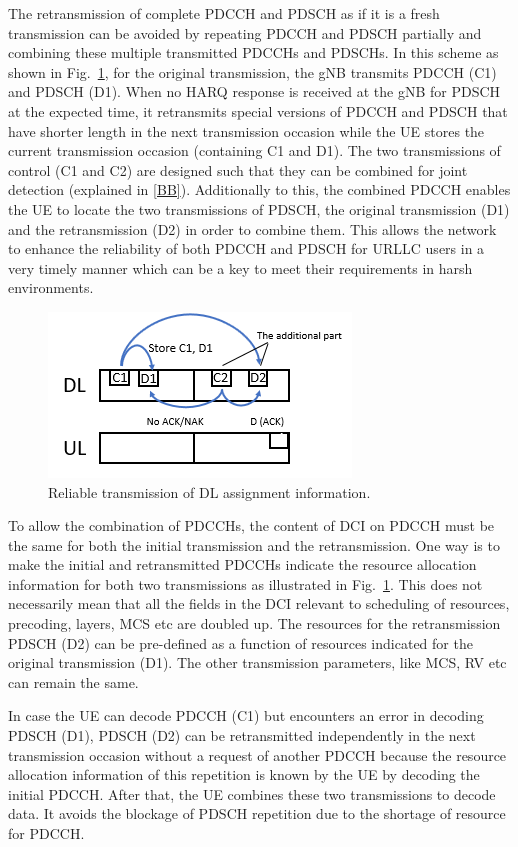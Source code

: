 \documentclass[conference,10pt]{IEEEtran}
\begin{document}
The retransmission of complete PDCCH and PDSCH as if it is a fresh transmission can be avoided by repeating PDCCH and PDSCH partially and combining these multiple transmitted PDCCHs and PDSCHs. In this scheme as shown in Fig.~\ref{fig1}, for the original transmission, the gNB transmits PDCCH (C1) and PDSCH (D1). When no HARQ response is received at the gNB for PDSCH at the expected time, it retransmits special versions of PDCCH and PDSCH that have shorter length in the next transmission occasion while the UE stores the current transmission occasion (containing C1 and D1). The two transmissions of control (C1 and C2) are designed such that they can be combined for joint detection (explained in \ref{BB}). Additionally to this, the combined PDCCH enables the UE to locate the two transmissions of PDSCH, the original transmission (D1) and the retransmission (D2) in order to combine them. This allows the network to enhance the reliability of both PDCCH and PDSCH for URLLC users in a very timely manner which can be a key to meet their requirements in harsh environments. 

\begin{figure}[htb]
\centerline{\includegraphics[scale=0.6]{fig1.png}}
\caption{Reliable transmission of DL assignment information.}
\label{fig1}
\end{figure}

To allow the combination of PDCCHs, the content of DCI on PDCCH must be the same for both the initial transmission and the retransmission. One way is to make the initial and retransmitted PDCCHs indicate the resource allocation information for both two transmissions as illustrated in Fig.~\ref{fig1}. This does not necessarily mean that all the fields in the DCI relevant to scheduling of resources, precoding, layers, MCS etc are doubled up. The resources for the retransmission PDSCH (D2) can be pre-defined as a function of resources indicated for the original transmission (D1). The other transmission parameters, like MCS, RV etc can remain the same.

In case the UE can decode PDCCH (C1) but encounters an error in decoding PDSCH (D1), PDSCH (D2) can be retransmitted independently in the next transmission occasion without a request of another PDCCH because the resource allocation information of this repetition is known by the UE by decoding the initial PDCCH. After that, the UE combines these two transmissions to decode data. It avoids the blockage of PDSCH repetition due to the shortage of resource for PDCCH. 
\end{document}
